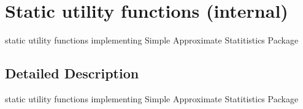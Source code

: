 \section{Static utility functions (internal)}
\label{group__stats__static}
static utility functions implementing Simple Approximate Statitistics Package 


\subsection{Detailed Description}
static utility functions implementing Simple Approximate Statitistics Package

